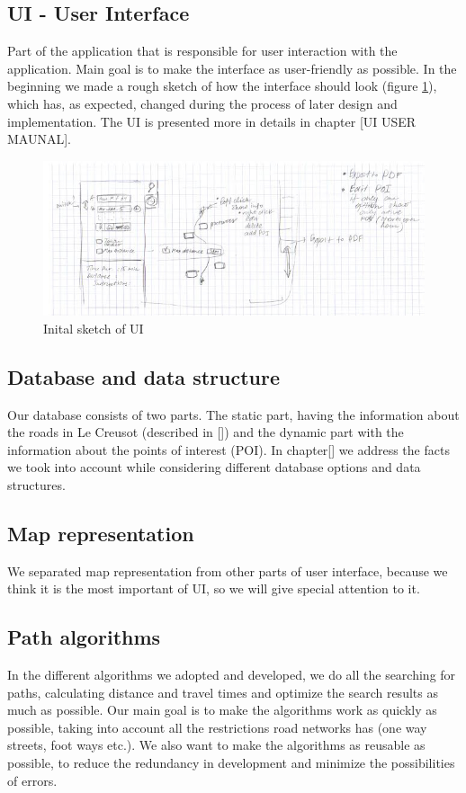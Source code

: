 \subsection{UI - User Interface}
Part of the application that is responsible for user interaction with the application. Main goal is to make the interface as user-friendly as possible. In the beginning we made a rough sketch of how the interface should look (figure \ref{fig:sketch}), which has, as expected, changed during the process of later design and implementation. The UI is presented more in details in chapter [UI USER MAUNAL].
\begin{figure}[h]
\centering
\includegraphics[width=0.6\linewidth]{../pictures/sketch.jpg}
\caption{Inital sketch of UI}
\label{fig:sketch}
\end{figure}
\subsection{Database and data structure}
Our database consists of two parts. The static part, having the information about the roads in Le Creusot (described in []) and the dynamic part with the information about the points of interest (POI). In chapter[] we address the facts we took into account while considering different database options and data structures.
\subsection{Map representation}
We separated map representation from other parts of user interface, because we think it is the most important of UI, so we will give special attention to it.
\subsection{Path algorithms}
In the different algorithms we adopted and developed, we do all the searching for paths, calculating distance and travel times and optimize the search results as much as possible. Our main goal is to make the algorithms work as  quickly as possible, taking into account all the restrictions road networks has (one way streets, foot ways etc.). We also want to make the algorithms as reusable as possible, to reduce the redundancy in development and minimize the possibilities of errors.


